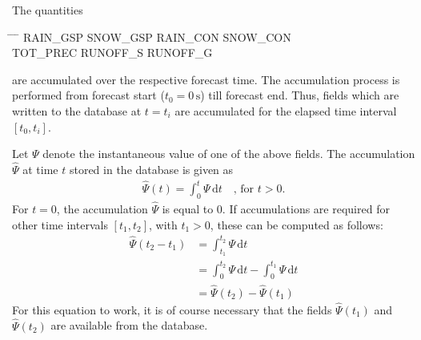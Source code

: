 The quantities
\begin{note}
\begin{tabbing}
  \hspace{0.2\textwidth} \= \hspace{0.2\textwidth} \= \hspace{0.2\textwidth} \= \hspace{0.2\textwidth} \kill
  RAIN\_GSP \>
  SNOW\_GSP \>
  RAIN\_CON \>
  SNOW\_CON \\
  TOT\_PREC  \>
  RUNOFF\_S  \>
  RUNOFF\_G
\end{tabbing}
\end{note}

are accumulated over the respective forecast time. The accumulation process is performed from forecast start  
($t_{0}=0\,\mathrm{s}$) till forecast end. Thus, fields which are written to the database at $t=t_{i}$ 
are accumulated for the elapsed time interval $[t_{0}, t_{i}]$.

Let $\Psi$ denote the instantaneous value of one of the above fields. The accumulation $\hat{\Psi}$ at time $t$ stored in the 
database is given as
\begin{align*}
 \hat{\Psi}(t) = \int_{0}^{t} \Psi\, \mathrm{d}t  \quad \text{, for } t>0.
\end{align*}
For $t=0$, the accumulation $\hat{\Psi}$ is equal to 0. 
If accumulations are required for other time intervals $[t_{1},t_{2}]$, with $t_{1}>0$, these can be computed as follows:
\begin{align*}
 \hat{\Psi}(t_{2}-t_{1}) &= \int_{t_{1}}^{t_{2}} \Psi\,\mathrm{d}t \\
                         &= \int_{0}^{t_{2}} \Psi\,\mathrm{d}t  - \int_{0}^{t_{1}} \Psi\,\mathrm{d}t \\
                         &= \hat{\Psi}(t_{2}) - \hat{\Psi}(t_{1})
\end{align*}
For this equation to work, it is of course necessary that the fields $\hat{\Psi}(t_{1})$ and $\hat{\Psi}(t_{2})$ are available from the database.

